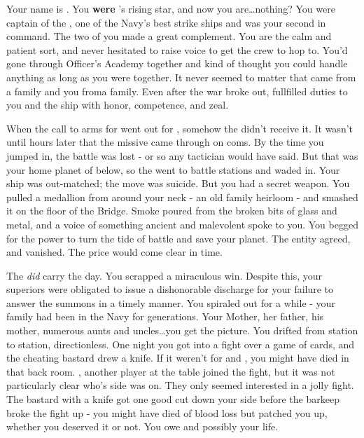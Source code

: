 \documentclass[char]{TMFHope}
\begin{document}
\name{\cCap{}}

Your name is \cCap{}. You {\bf were} \pTMN{}'s rising star, and now you are\ldots nothing? You were captain of the \pOld{}, one of the Navy's best strike ships and \cXO{} was your second in command. The two of you made a great complement. You are the calm and patient sort, and \cXO{} never hesitated to raise \cXO{\their} voice to get the crew to hop to. You'd gone through Officer's Academy together and kind of thought you could handle anything as long as you were together. It never seemed to matter that \cXO{} came from a \pEdge{} family and you froma \pPlan{} family. Even after the war broke out, \cXO{\they} fullfilled \cXO{\their} duties to you and the ship with honor, competence, and zeal. 

When the call to arms for went out for \pBattle{}, somehow the \pOld{} didn't receive it. It wasn't until hours later that the  missive came through on coms. By the time you jumped in, the battle was lost - or so any tactician would have said. But that was your home planet of \pHome{} below, so the \pOld{} went to battle stations and waded in. Your ship was out-matched; the move was suicide. But you had a secret weapon. You pulled a medallion from around your neck - an old family heirloom - and smashed it on the floor of the Bridge. Smoke poured from the broken bits of glass and metal, and a voice of something ancient and malevolent spoke to you. You begged for the power to turn the tide of battle and save your planet. The entity agreed, and vanished. The price would come clear in time.

The \pOld{} \emph{did} carry the day. You scrapped a miraculous win. Despite this, your superiors were obligated to issue a dishonorable discharge for your failure to answer the summons in a timely manner. You spiraled out for a while - your family had been in the Navy for generations. Your Mother, her father, his mother, numerous aunts and uncles\ldots you get the picture. You drifted from station to station, directionless. One night you got into a fight over a game of cards, and the cheating bastard drew a knife. If it weren't for \cSci{} and \cMed{}, you might have died in that back room. \cSci{}, another player at the table joined the fight, but it was not particularly clear who's side \cSci{\they} was on. They only seemed interested in a jolly fight. The bastard with a knife got one good cut down your side before the barkeep broke the fight up - you might have died of blood loss but \cMed{} patched you up, whether you deserved it or not. You owe \cMed{} and possibly \cSci{} your life.
\end{document}
